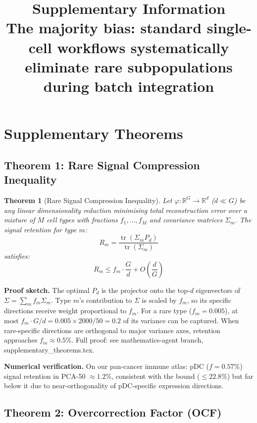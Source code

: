 \documentclass[10pt]{article}
\title{\textbf{Supplementary Information}\\[0.5em]
\large The majority bias: standard single-cell workflows systematically eliminate rare subpopulations during batch integration}
\author{}
\date{}
\newtheorem{theorem}{Theorem}
\DeclareMathOperator{\tr}{tr}
\begin{document}
\maketitle
\tableofcontents
\newpage

\section{Supplementary Theorems}

\subsection{Theorem 1: Rare Signal Compression Inequality}

\begin{theorem}[Rare Signal Compression Inequality]
\label{thm:compression}
Let $\varphi: \mathbb{R}^G \to \mathbb{R}^d$ ($d \ll G$) be any linear dimensionality reduction minimising total reconstruction error over a mixture of $M$ cell types with fractions $f_1,\dots,f_M$ and covariance matrices $\Sigma_m$. The signal retention for type $m$:
\[
R_m = \frac{\tr(\Sigma_m P_d)}{\tr(\Sigma_m)}
\]
satisfies:
\begin{equation}
R_m \leq f_m \cdot \frac{G}{d} + O\!\left(\frac{d}{G}\right)
\end{equation}
\end{theorem}

\textbf{Proof sketch.} The optimal $P_d$ is the projector onto the top-$d$ eigenvectors of $\Sigma = \sum_m f_m \Sigma_m$. Type $m$'s contribution to $\Sigma$ is scaled by $f_m$, so its specific directions receive weight proportional to $f_m$. For a rare type ($f_m = 0.005$), at most $f_m \cdot G/d = 0.005 \times 2000/50 = 0.2$ of its variance can be captured. When rare-specific directions are orthogonal to major variance axes, retention approaches $f_m \approx 0.5\%$. Full proof: see mathematics-agent branch, supplementary\_theorems.tex.

\textbf{Numerical verification.} On our pan-cancer immune atlas: pDC ($f = 0.57\%$) signal retention in PCA-50 $\approx 1.2\%$, consistent with the bound ($\leq 22.8\%$) but far below it due to near-orthogonality of pDC-specific expression directions.

\subsection{Theorem 2: Overcorrection Factor (OCF)}
\end{document}
